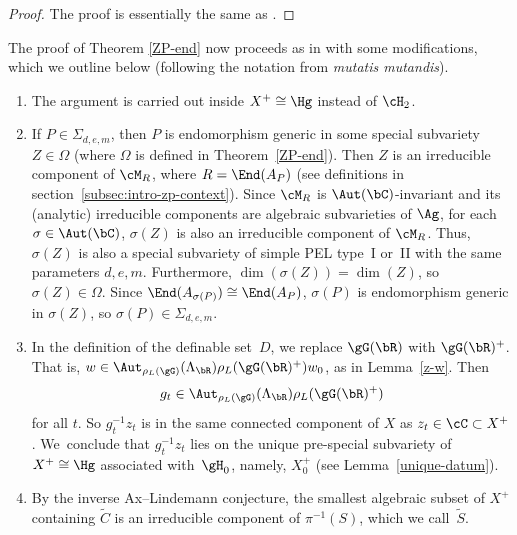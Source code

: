 \begin{proof}
The proof is essentially the same as \cite[Cor.\,6.4]{QRTUI}.
\end{proof}

The proof of Theorem \ref{ZP-end} now proceeds as in
\cite[\S6.5]{QRTUI} with some modifications, which we outline below (following the notation from \cite[\S6.5]{QRTUI} \textit{mutatis mutandis}).
\begin{enumerate}
\item The argument is carried out inside $X^+ \cong \Hg$ instead of $\cH_2$.

\item If $P \in \Sigma_{d,e,m}$, then $P$ is endomorphism generic in some special subvariety $Z \in \Omega$ (where $\Omega$ is defined in Theorem~\ref{ZP-end}).
Then $Z$ is an irreducible component of $\cM_R$, where $R = \End(A_P)$ (see definitions in section~\ref{subsec:intro-zp-context}).
Since $\cM_R$ is $\Aut(\bC)$-invariant and its (analytic) irreducible components are algebraic subvarieties of $\Ag$, for each $\sigma \in \Aut(\bC)$, $\sigma(Z)$ is also an irreducible component of $\cM_R$.
Thus, $\sigma(Z)$ is also a special subvariety of simple PEL type~I or~II with the same parameters $d,e,m$.
Furthermore, $\dim(\sigma(Z)) = \dim(Z)$, so $\sigma(Z) \in \Omega$.
Since $\End(A_{\sigma(P)}) \cong \End(A_P)$, $\sigma(P)$ is endomorphism generic in $\sigma(Z)$, so $\sigma(P) \in \Sigma_{d,e,m}$.

\item In the definition of the definable set~$D$, we replace $\gG(\bR)$ with $\gG(\bR)^+$. That is, $w\in\Aut_{\rho_L(\gG)}(\Lambda_\bR)\rho_L(\gG(\bR)^+)w_0$, as in Lemma~\ref{z-w}. Then
\[g_t \in \Aut_{\rho_L(\gG)}(\Lambda_\bR) \rho_L(\gG(\bR)^+)\] for all $t$. So $g_t^{-1}z_t$ is in the same connected component of $X$ as $z_t \in \cC \subset X^+$. We~conclude that $g_t^{-1}z_t$ lies on the unique pre-special subvariety of $X^+\cong\Hg$ associated with~$\gH_0$, namely, $X^+_0$ (see Lemma~\ref{unique-datum}).

\item By the inverse Ax--Lindemann conjecture, the smallest algebraic subset of $X^+$ containing $\tilde{C}$ is an irreducible component of $\pi^{-1}(S)$, which we call~$\tilde{S}$.


\end{enumerate}
